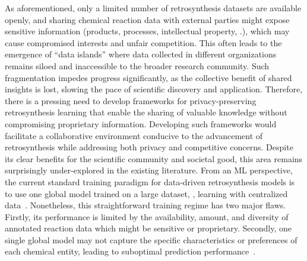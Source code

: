 As aforementioned, only a limited number of retrosynthesis datasets are available openly, and sharing chemical reaction data with external parties might expose sensitive information (products, processes, intellectual property, \etc.), which may cause compromised interests and unfair competition. This often leads to the emergence of ``data islands'' where data collected in different organizations remains siloed and inaccessible to the broader research community. Such fragmentation impedes progress significantly, as the collective benefit of shared insights is lost, slowing the pace of scientific discovery and application. Therefore, there is a pressing need to develop frameworks for privacy-preserving retrosynthesis learning that enable the sharing of valuable knowledge without compromising proprietary information. Developing such frameworks would facilitate a collaborative environment conducive to the advancement of retrosynthesis while addressing both privacy and competitive concerns. Despite its clear benefits for the scientific community and societal good, this area remains surprisingly under-explored in the existing literature. From an ML perspective, the current standard training paradigm for data-driven retrosynthesis models is to use one global model trained on a large dataset, \ie, learning with centralized data~\citep{coley2017computer,baylon2019enhancing,yan2020retroxpert,sun2021towards,wan2022retroformer,fang2023single}. Nonetheless, this straightforward training regime has two major flaws. Firstly, its performance is limited by the availability, amount, and diversity of annotated reaction data which might be sensitive or proprietary. Secondly, one single global model may not capture the specific characteristics or preferences of each chemical entity, leading to suboptimal prediction performance~\citep{zhang2021personalized,huang2021personalized}. 




